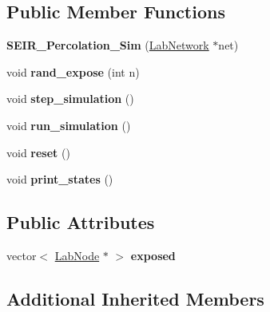 \subsection*{Public Member Functions}
\begin{DoxyCompactItemize}
\item 
\hypertarget{classstudy_1_1_s_e_i_r___percolation___sim_a66b37dc0059cf3bf8c89ff6d2569eca5}{{\bfseries S\+E\+I\+R\+\_\+\+Percolation\+\_\+\+Sim} (\hyperlink{classelps_1_1_lab_network}{Lab\+Network} $\ast$net)}\label{classstudy_1_1_s_e_i_r___percolation___sim_a66b37dc0059cf3bf8c89ff6d2569eca5}

\item 
\hypertarget{classstudy_1_1_s_e_i_r___percolation___sim_aa9c5c257818e4bee2a788c22d245c1c2}{void {\bfseries rand\+\_\+expose} (int n)}\label{classstudy_1_1_s_e_i_r___percolation___sim_aa9c5c257818e4bee2a788c22d245c1c2}

\item 
\hypertarget{classstudy_1_1_s_e_i_r___percolation___sim_ae2e3573769578d5c46dcbcb7f6194ab4}{void {\bfseries step\+\_\+simulation} ()}\label{classstudy_1_1_s_e_i_r___percolation___sim_ae2e3573769578d5c46dcbcb7f6194ab4}

\item 
\hypertarget{classstudy_1_1_s_e_i_r___percolation___sim_ae491abdacdba828c2ddf5d823ca5ac45}{void {\bfseries run\+\_\+simulation} ()}\label{classstudy_1_1_s_e_i_r___percolation___sim_ae491abdacdba828c2ddf5d823ca5ac45}

\item 
\hypertarget{classstudy_1_1_s_e_i_r___percolation___sim_a954bd0a3d43d9ca01c5ad1bd514bfb04}{void {\bfseries reset} ()}\label{classstudy_1_1_s_e_i_r___percolation___sim_a954bd0a3d43d9ca01c5ad1bd514bfb04}

\item 
\hypertarget{classstudy_1_1_s_e_i_r___percolation___sim_a3324ddf9aec5de4cc2ad5a8bc8b7676c}{void {\bfseries print\+\_\+states} ()}\label{classstudy_1_1_s_e_i_r___percolation___sim_a3324ddf9aec5de4cc2ad5a8bc8b7676c}

\end{DoxyCompactItemize}
\subsection*{Public Attributes}
\begin{DoxyCompactItemize}
\item 
\hypertarget{classstudy_1_1_s_e_i_r___percolation___sim_af4de4fb34fe33a5a3fea76e19a1a1b51}{vector$<$ \hyperlink{classelps_1_1_lab_node}{Lab\+Node} $\ast$ $>$ {\bfseries exposed}}\label{classstudy_1_1_s_e_i_r___percolation___sim_af4de4fb34fe33a5a3fea76e19a1a1b51}

\end{DoxyCompactItemize}
\subsection*{Additional Inherited Members}
